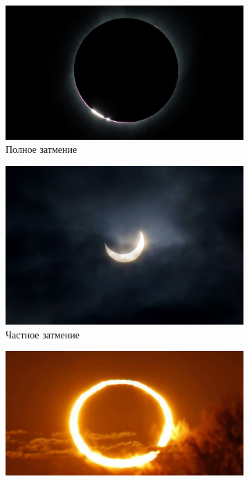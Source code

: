 \documentclass{article}
\begin{document}
    \begin{figure}[p] 
    \centering 
    \begin{subfigure}[b]{0.45\textwidth} 
    	\includegraphics[width = \textwidth]{img/5}  
    	\caption{Полное затмение} 
    \end{subfigure} 
    \begin{subfigure}[b]{0.38\textwidth} 
    	\includegraphics[width = \textwidth]{img/4} 
    	\caption{Частное затмение} 
    \end{subfigure} 
    \begin{subfigure}[b]{0.45\textwidth} 							\includegraphics[width = \textwidth]{img/3} 

\end{subfigure}
\end{figure}
\end{document}
